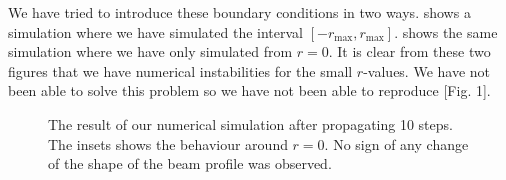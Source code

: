 We have tried to introduce these boundary conditions in two ways.  shows a
simulation where we have simulated the interval \mbox{$[-r_\text{max},r_\text{max}]$}.  shows the same simulation
where we have only simulated from $r = 0$. It is clear from these two figures that we have numerical
instabilities for the small $r$-values. We have not been able to solve this problem so we have not
been able to reproduce \cite{prl-selffocus}[Fig. 1]. 
\begin{figure}[htb]
  \centering
  \hfill %
% 
  \caption{The result of our numerical simulation after propagating 10 steps. The insets shows the
    behaviour around $r=0$. No sign of any change of the shape of 
    the beam profile was observed.}
  \label{fig:kerr-num}
\end{figure}



